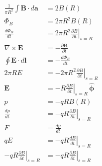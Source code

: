 \documentclass{article}
\renewcommand{\vec}[1]{\boldsymbol{\mathbf{#1}}}
\newcommand{\uvec}[1]{\hat{\vec{#1}}}
\begin{document}
\subsection{}

\begin{align*}
  \frac{1}{\pi R^2} \int \vec{B} \cdot d \vec{a}            & = 2 B(R)                                                                \\
  \Phi_B                                                    & = 2 \pi R^2 B(R)                                                        \\
  \frac{d \Phi_B}{d t}                                      & = 2 \pi R^2 \left. \frac{\partial B}{\partial t} \right|_{s = R}        \\
  \nabla \times \vec{E}                                     & = -\frac{\partial \vec{B}}{\partial t}                                  \\
  \oint \vec{E} \cdot d \vec{l}                             & = -\frac{d \Phi_B}{d t}                                                 \\
  2 \pi R E                                                 & = -2 \pi R^2 \left. \frac{\partial B}{\partial t} \right|_{s = R}       \\
  \vec{E}                                                   & = -R \left. \frac{\partial B}{\partial t} \right|_{s = R} \,\uvec{\phi} \\
  p                                                         & = -q R B(R)                                                             \\
  \frac{d p}{d t}                                           & = -q R \left. \frac{\partial B}{\partial t} \right|_{s = R}             \\
  F                                                         & = \frac{d p}{d t}                                                       \\
  q E                                                       & = -q R \left. \frac{d B}{d t} \right|_{s = R}                           \\
  -q R \left. \frac{\partial B}{\partial t} \right|_{s = R} & = -q R \left. \frac{\partial B}{\partial t} \right|_{s = R}
\end{align*}

\subsection{}
\end{document}
